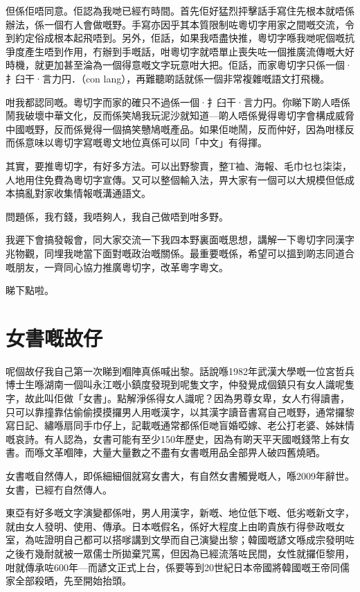 \documentclass[a5paper, 10pt, openany]{book} %
\begin{document}
但係佢唔同意。佢認為我哋已經冇時間。首先佢好猛烈抨擊話手寫住先根本就唔係辦法，係一個冇人會做嘅野。手寫亦因乎其本質限制咗粵切字用家之間嘅交流，令到約定俗成根本起飛唔到。另外，佢話，如果我唔盡快推，粵切字喺我哋呢個嘅抗爭度產生唔到作用，冇辦到手嘅話，咁粵切字就唔單止喪失咗一個推廣流傳嘅大好時機，就更加甚至淪為一個得意嘅文字玩意咁大把。佢話，而家粵切字只係一個·扌臼干·言力円．（con lang），再難聽啲話就係一個非常複雜嘅語文打飛機。

咁我都認同嘅。粵切字而家的確只不過係一個·扌臼干·言力円\textsubscript{}。你睇下啲人唔係鬧我破壞中華文化，反而係笑鳩我玩泥沙就知道—啲人唔係覺得粵切字會構成威脅中國嘅野，反而係覺得一個搞笑戇鳩嘅產品。如果佢哋鬧，反而仲好，因為咁樣反而係意味以粵切字寫嘅粵文地位真係可以同「中文」有得揮。

其實，要推粵切字，有好多方法。可以出野黎賣，整T裇、海報、毛巾乜乜柒柒，人地用住免費為粵切字宣傳。又可以整個輸入法，畀大家有一個可以大規模但低成本搞亂對家收集情報嘅溝通語文。

問題係，我冇錢，我唔夠人，我自己做唔到咁多野。

我遲下會搞發報會，同大家交流一下我四本野裏面嘅思想，講解一下粵切字同漢字兆物觀，同埋我哋當下面對嘅政治嘅關係。最重要嘅係，希望可以搵到啲志同道合嘅朋友，一齊同心協力推廣粵切字，改革粵字粵文。

睇下點啦。


\chapter{女書嘅故仔}
呢個故仔我自己第一次睇到嗰陣真係喊出黎。話說喺1982年武漢大學嘅一位宮哲兵博士生喺湖南一個叫永江嘅小鎮度發現到呢隻文字，仲發覺成個鎮只有女人識呢隻字，故此叫佢做「女書」。點解淨係得女人識呢？因為男尊女卑，女人冇得讀書，只可以靠撞靠估偷偷摸摸攞男人用嘅漢字，以其漢字讀音書寫自己嘅野，通常攞黎寫日記、繡喺扇同手巾仔上，記載嘅通常都係佢哋盲婚啞嫁、老公打老婆、姊妹情嘅哀詩。有人認為，女書可能有至少150年歷史，因為有啲天平天國嘅錢幣上有女書。而喺文革嗰陣，大量大量數之不盡有女書嘅用品全部畀人破四舊燒晒。

女書嘅自然傳人，即係細細個就寫女書大，有自然女書觸覺嘅人，喺2009年辭世。女書，已經冇自然傳人。


東亞有好多嘅文字演變都係咁，男人用漢字，新嘅、地位低下嘅、低劣嘅新文字，就由女人發明、使用、傳承。日本嘅假名，係好大程度上由啲貴族冇得參政嘅女室，為咗證明自己都可以搭嗲講到文學而自己演變出黎；韓國嘅諺文喺成宗發明咗之後冇幾耐就被一眾儒士所拋棄咒罵，但因為已經流落咗民間，女性就攞佢黎用，咁就傳承咗600年—而諺文正式上台，係要等到20世紀日本帝國將韓國嘅王帝同儒家全部殺晒，先至開始抬頭。
\end{document}
